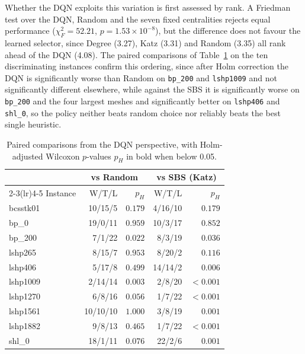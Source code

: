 \documentclass[runningheads]{llncs}
\begin{document}
Whether the DQN exploits this variation is first assessed by rank. A Friedman test over the DQN, Random and the seven fixed centralities rejects equal performance ($\chi_F^2=52.21$, $p=1.53\times10^{-8}$), but the difference does not favour the learned selector, since Degree (3.27), Katz (3.31) and Random (3.35) all rank ahead of the DQN (4.08). The paired comparisons of Table~\ref{tab:posthoc} on the ten discriminating instances confirm this ordering, since after Holm correction the DQN is significantly worse than Random on \texttt{bp\_200} and \texttt{lshp1009} and not significantly different elsewhere, while against the SBS it is significantly worse on \texttt{bp\_200} and the four largest meshes and significantly better on \texttt{lshp406} and \texttt{shl\_0}, so the policy neither beats random choice nor reliably beats the best single heuristic.

\begin{table}[!tb]
\centering
\caption{Paired comparisons from the DQN perspective, with Holm-adjusted Wilcoxon $p$-values $p_H$ in bold when below 0.05.}
\label{tab:posthoc}
\scriptsize
\setlength{\tabcolsep}{5pt}
\begin{tabular}{lrrrr}
\toprule
& \multicolumn{2}{c}{vs Random} & \multicolumn{2}{c}{vs SBS (Katz)}\\
\cmidrule(lr){2-3}\cmidrule(lr){4-5}
Instance & W/T/L & $p_H$ & W/T/L & $p_H$\\
\midrule
bcsstk01 & 10/15/5 & $0.179$ & 4/16/10 & $0.179$\\
bp\_0 & 19/0/11 & $0.959$ & 10/3/17 & $0.852$\\
bp\_200 & 7/1/22 & $\mathbf{0.022}$ & 8/3/19 & $\mathbf{0.036}$\\
lshp265 & 8/15/7 & $0.953$ & 8/20/2 & $0.116$\\
lshp406 & 5/17/8 & $0.499$ & 14/14/2 & $\mathbf{0.006}$\\
lshp1009 & 2/14/14 & $\mathbf{0.003}$ & 2/8/20 & $\mathbf{<0.001}$\\
lshp1270 & 6/8/16 & $0.056$ & 1/7/22 & $\mathbf{<0.001}$\\
lshp1561 & 10/10/10 & $1.000$ & 3/8/19 & $\mathbf{0.001}$\\
lshp1882 & 9/8/13 & $0.465$ & 1/7/22 & $\mathbf{<0.001}$\\
shl\_0 & 18/1/11 & $0.076$ & 22/2/6 & $\mathbf{0.001}$\\
\bottomrule
\end{tabular}
\end{table}
\end{document}
